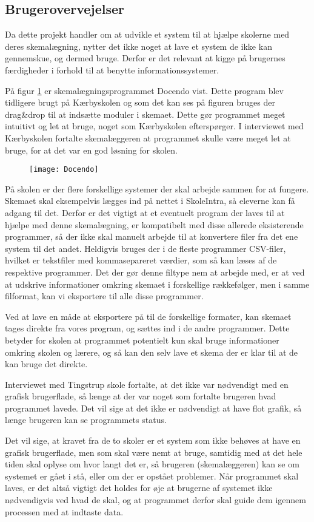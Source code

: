\subsection{Brugerovervejelser}
Da dette projekt handler om at udvikle et system til at hjælpe skolerne med deres skemalægning, nytter det ikke noget at lave et system de ikke kan gennemskue, og dermed bruge. Derfor er det relevant at kigge på brugernes færdigheder i forhold til at benytte informationssystemer.

På figur \ref{fig:docendo_skema} er skemalægningsprogrammet Docendo vist. Dette program blev tidligere brugt på Kærbyskolen og som det kan ses på figuren bruges der drag\&drop til at indsætte moduler i skemaet. Dette gør programmet meget intuitivt og let at bruge, noget som Kærbyskolen efterspørger. I interviewet med Kærbyskolen fortalte skemalæggeren at programmet skulle være meget let at bruge, for at det var en god løsning for skolen.

\begin{figure}[h!]
	\centering
	\texttt{[image: Docendo]}
	\label{fig:docendo_skema}
\end{figure}

På skolen er der flere forskellige systemer der skal arbejde sammen for at fungere. Skemaet skal eksempelvis lægges ind på nettet i SkoleIntra, så eleverne kan få adgang til det. Derfor er det vigtigt at et eventuelt program der laves til at hjælpe med denne skemalægning, er kompatibelt med disse allerede eksisterende programmer, så der ikke skal manuelt arbejde til at konvertere filer fra det ene system til det andet. Heldigvis bruges der i de fleste programmer CSV-filer, hvilket er tekstfiler med kommasepareret værdier, som så kan læses af de respektive programmer. Det der gør denne filtype nem at arbejde med, er at ved at udskrive informationer omkring skemaet i forskellige rækkefølger, men i samme filformat, kan vi eksportere til alle disse programmer.

Ved at lave en måde at eksportere på til de forskellige formater, kan skemaet tages direkte fra vores program, og sættes ind i de andre programmer. Dette betyder for skolen at programmet potentielt kun skal bruge informationer omkring skolen og lærere, og så kan den selv lave et skema der er klar til at de kan bruge det direkte.

Interviewet med Tingstrup skole fortalte, at det ikke var nødvendigt med en grafisk brugerflade, så længe at der var noget som fortalte brugeren hvad programmet lavede. Det vil sige at det ikke er nødvendigt at have flot grafik, så længe brugeren kan se programmets status. 

Det vil sige, at kravet fra de to skoler er et system som ikke behøves at have en grafisk brugerflade, men som skal være nemt at bruge, samtidig med at det hele tiden skal oplyse om hvor langt det er, så brugeren (skemalæggeren) kan se om systemet er gået i stå, eller om der er opstået problemer. Når programmet skal laves, er det altså vigtigt det holdes for øje at brugerne af systemet ikke nødvendigvis ved hvad de skal, og at programmet derfor skal guide dem igennem processen med at indtaste data.
